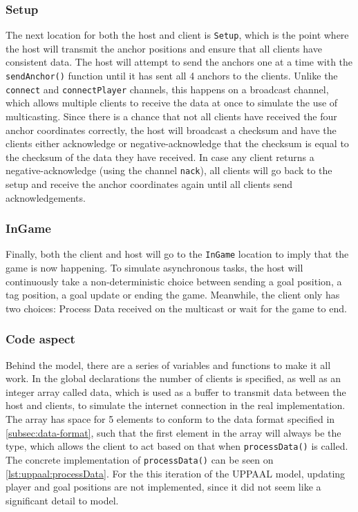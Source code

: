 \subsubsection{Setup}
The next location for both the host and client is \texttt{Setup}, which is the point where the host will transmit the anchor positions and ensure that all clients have consistent data.
The host will attempt to send the anchors one at a time with the \texttt{sendAnchor()} function until it has sent all 4 anchors to the clients.
Unlike the \texttt{connect} and \texttt{connectPlayer} channels, this happens on a broadcast channel, which allows multiple clients to receive the data at once to simulate the use of multicasting.
Since there is a chance that not all clients have received the four anchor coordinates correctly, the host will broadcast a checksum and have the clients either acknowledge or negative-acknowledge that the checksum is equal to the checksum of the data they have received.
In case any client returns a negative-acknowledge (using the channel \texttt{nack}), all clients will go back to the setup and receive the anchor coordinates again until all clients send acknowledgements.

\subsubsection{InGame}
Finally, both the client and host will go to the \texttt{InGame} location to imply that the game is now happening.
To simulate asynchronous tasks, the host will continuously take a non-deterministic choice between sending a goal position, a tag position, a goal update or ending the game.
Meanwhile, the client only has two choices: Process Data received on the multicast or wait for the game to end.

\subsubsection{Code aspect}
Behind the model, there are a series of variables and functions to make it all work.
In the global declarations the number of clients is specified, as well as an integer array called data, which is used as a buffer to transmit data between the host and clients, to simulate the internet connection in the real implementation.
The array has space for 5 elements to conform to the data format specified in \autoref{subsec:data-format}, such that the first element in the array will always be the type, which allows the client to act based on that when \texttt{processData()} is called.
The concrete implementation of \texttt{processData()} can be seen on \autoref{lst:uppaal:processData}.
For the this iteration of the UPPAAL model, updating player and goal positions are not implemented, since it did not seem like a significant detail to model.

